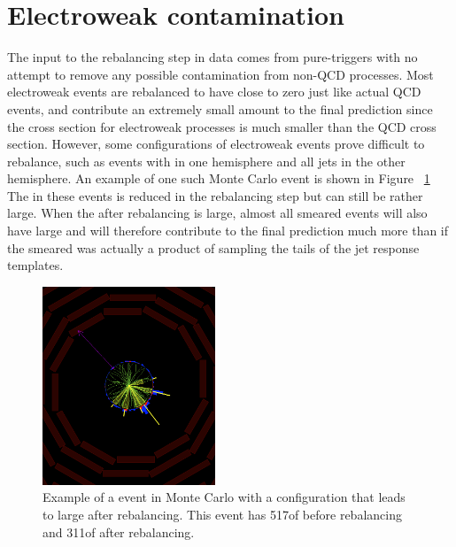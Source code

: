\clearpage
\section{Electroweak contamination}
The input to the rebalancing step in data comes from pure-\Ht triggers with no attempt to remove any possible contamination from non-QCD processes. Most electroweak events
are rebalanced to have \ptmiss close to zero just like actual QCD events, and contribute an extremely small amount to the final prediction since the cross section for electroweak processes
is much smaller than the QCD cross section. However, some configurations of electroweak events prove difficult to rebalance, such as events with \ptmiss in one hemisphere and all
jets in the other hemisphere. An example of one such Monte Carlo event is shown in Figure ~\ref{Fig:rs_ewk_zinv_event} The \ptmiss in these events is reduced in the rebalancing step
but can still be rather large. When the \ptmiss after rebalancing is large, almost all smeared events will also have large \ptmiss and will therefore contribute to the final prediction
much more than if the smeared \ptmiss was actually a product of sampling the tails of the jet response templates.

\begin{figure}[htbp]
  \begin{center}
    \includegraphics[width=0.46\textwidth]{figs/qcd/rs_mc/ewk/zinv_ht400to600_met500_njet6.png}
    \caption{Example of a \znunu event in Monte Carlo with a configuration that leads to large \ptmiss after rebalancing.
             This event has 517\GeV of \ptmiss before rebalancing and 311\GeV of \ptmiss after rebalancing.
            }
    \label{Fig:rs_ewk_zinv_event}
  \end{center}
\end{figure}

